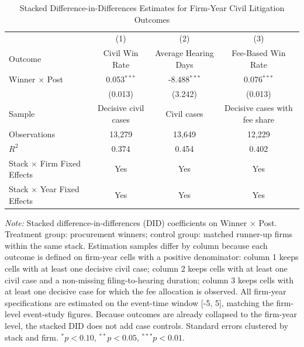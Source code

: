 \begin{table}[!htbp]
\setlength{\abovecaptionskip}{0pt}
\centering
\caption{Stacked Difference-in-Differences Estimates for Firm-Year Civil Litigation Outcomes}
\label{tab:firm_level_stacked_did}
\begin{threeparttable}
\begin{tabular}{lccc}
\toprule
 & (1) & (2) & (3) \\
Outcome & Civil Win Rate & Average Hearing Days & Fee-Based Win Rate \\
\midrule
Winner $\times$ Post & 0.053$^{***}$ & -8.488$^{***}$ & 0.076$^{***}$ \\
& (0.013) & (3.242) & (0.013) \\
\addlinespace
Sample & Decisive civil cases & Civil cases & Decisive cases with fee share \\
Observations & 13,279 & 13,649 & 12,229 \\
$R^2$ & 0.374 & 0.454 & 0.402 \\
Stack $\times$ Firm Fixed Effects & Yes & Yes & Yes \\
Stack $\times$ Year Fixed Effects & Yes & Yes & Yes \\
\bottomrule
\end{tabular}
\begin{tablenotes}[flushleft]
\footnotesize
\item \textit{Note:} Stacked difference-in-differences (DID) coefficients on Winner $\times$ Post. Treatment group: procurement winners; control group: matched runner-up firms within the same stack. Estimation samples differ by column because each outcome is defined on firm-year cells with a positive denominator: column 1 keeps cells with at least one decisive civil case; column 2 keeps cells with at least one civil case and a non-missing filing-to-hearing duration; column 3 keeps cells with at least one decisive case for which the fee allocation is observed. All firm-year specifications are estimated on the event-time window [-5, 5], matching the firm-level event-study figures. Because outcomes are already collapsed to the firm-year level, the stacked DID does not add case controls. Standard errors clustered by stack and firm. $^{*}p<0.10$, $^{**}p<0.05$, $^{***}p<0.01$.
\end{tablenotes}
\end{threeparttable}
\end{table}
